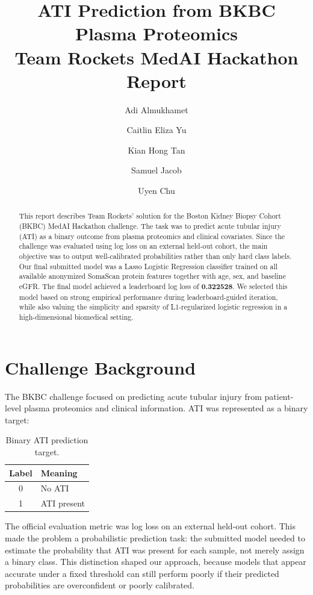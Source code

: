 \documentclass[11pt]{article}
\title{\textbf{ATI Prediction from BKBC Plasma Proteomics}\\
\large Team Rockets MedAI Hackathon Report}
\author{
Adi Almukhamet \and
Caitlin Eliza Yu \and
Kian Hong Tan \and
Samuel Jacob \and
Uyen Chu
}
\date{}
\begin{document}
\maketitle

\begin{abstract}
This report describes Team Rockets' solution for the Boston Kidney Biopsy Cohort (BKBC) MedAI Hackathon challenge. The task was to predict acute tubular injury (ATI) as a binary outcome from plasma proteomics and clinical covariates. Since the challenge was evaluated using log loss on an external held-out cohort, the main objective was to output well-calibrated probabilities rather than only hard class labels. Our final submitted model was a Lasso Logistic Regression classifier trained on all available anonymized SomaScan protein features together with age, sex, and baseline eGFR. The final model achieved a leaderboard log loss of \textbf{0.322528}. We selected this model based on strong empirical performance during leaderboard-guided iteration, while also valuing the simplicity and sparsity of L1-regularized logistic regression in a high-dimensional biomedical setting.
\end{abstract}

\section{Challenge Background}

The BKBC challenge focused on predicting acute tubular injury from patient-level plasma proteomics and clinical information. ATI was represented as a binary target:

\begin{table}[h]
\centering
\begin{tabular}{cl}
\toprule
\textbf{Label} & \textbf{Meaning} \\
\midrule
0 & No ATI \\
1 & ATI present \\
\bottomrule
\end{tabular}
\caption{Binary ATI prediction target.}
\label{tab:ati}
\end{table}

The official evaluation metric was log loss on an external held-out cohort. This made the problem a probabilistic prediction task: the submitted model needed to estimate the probability that ATI was present for each sample, not merely assign a binary class. This distinction shaped our approach, because models that appear accurate under a fixed threshold can still perform poorly if their predicted probabilities are overconfident or poorly calibrated.
\end{document}
